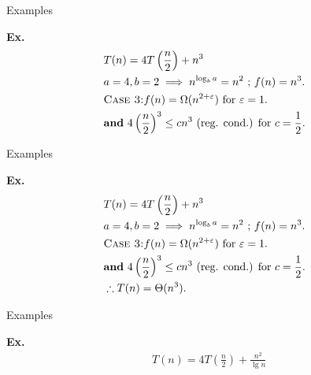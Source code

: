 \documentclass{beamer}
\begin{document}
\begin{frame}{Examples}
    \begin{exampleblock}{\textbf{Ex.}}
        \vspace{-8mm}
        \begin{align*}
            & T(n) = 4T\left(\frac{n}{2} \right) + n^3 \\
            & a = 4, b = 2 \implies n^{\log_b a} = n^2 \text{ ; } f(n) = n^3 \text{.} \\
            & \text{\textsc{Case 3:}} f(n) = \Omega(n^{2 + \varepsilon}) \text{ for } \varepsilon = 1 \text{.} \\
            & \text{\textbf{and} } 4\left(\frac{n}{2} \right)^3 \leq cn^3 \text{ (reg. cond.) for } c = \frac{1}{2} \text{.} \\
        \end{align*}
    \end{exampleblock}
\end{frame}

\begin{frame}{Examples}
    \begin{exampleblock}{\textbf{Ex.}}
        \vspace{-8mm}
        \begin{align*}
            & T(n) = 4T\left(\frac{n}{2} \right) + n^3 \\
            & a = 4, b = 2 \implies n^{\log_b a} = n^2 \text{ ; } f(n) = n^3 \text{.} \\
            & \text{\textsc{Case 3:}} f(n) = \Omega(n^{2 + \varepsilon}) \text{ for } \varepsilon = 1 \text{.} \\
            & \text{\textbf{and} } 4\left(\frac{n}{2} \right)^3 \leq cn^3 \text{ (reg. cond.) for } c = \frac{1}{2} \text{.} \\
            & \therefore T(n) = \Theta(n^3) \text{.} \\
        \end{align*}
    \end{exampleblock}
\end{frame}

\begin{frame}{Examples}
    \begin{exampleblock}{\textbf{Ex.}}
        \vspace{-8mm}
        \begin{align*}
            & T(n) = 4T\left(\frac{n}{2} \right) + \frac{n^2}{\lg n} \\
        \end{align*}
    \end{exampleblock}
\end{frame}
\end{document}
